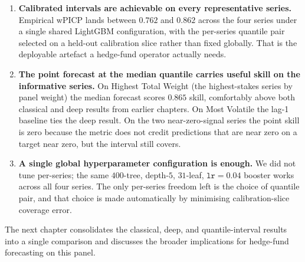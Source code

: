 \begin{enumerate}
  \item \textbf{Calibrated intervals are achievable on every representative series.} Empirical wPICP lands between $0.762$ and $0.862$ across the four series under a single shared LightGBM configuration, with the per-series quantile pair selected on a held-out calibration slice rather than fixed globally. That is the deployable artefact a hedge-fund operator actually needs.
  \item \textbf{The point forecast at the median quantile carries useful skill on the informative series.} On Highest Total Weight (the highest-stakes series by panel weight) the median forecast scores $0.865$ skill, comfortably above both classical and deep results from earlier chapters. On Most Volatile the lag-1 baseline ties the deep result. On the two near-zero-signal series the point skill is zero because the metric does not credit predictions that are near zero on a target near zero, but the interval still covers.
  \item \textbf{A single global hyperparameter configuration is enough.} We did not tune per-series; the same $400$-tree, depth-$5$, $31$-leaf, $\mathtt{lr}{=}0.04$ booster works across all four series. The only per-series freedom left is the choice of quantile pair, and that choice is made automatically by minimising calibration-slice coverage error.
\end{enumerate}

The next chapter consolidates the classical, deep, and quantile-interval results into a single comparison and discusses the broader implications for hedge-fund forecasting on this panel.
